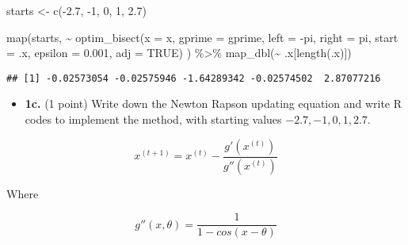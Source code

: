 \documentclass[
]{article}
\newenvironment{Shaded}{\begin{snugshade}}{\end{snugshade}}
\newcommand{\AttributeTok}[1]{\textcolor[rgb]{0.77,0.63,0.00}{#1}}
\newcommand{\ConstantTok}[1]{\textcolor[rgb]{0.00,0.00,0.00}{#1}}
\newcommand{\DecValTok}[1]{\textcolor[rgb]{0.00,0.00,0.81}{#1}}
\newcommand{\FloatTok}[1]{\textcolor[rgb]{0.00,0.00,0.81}{#1}}
\newcommand{\FunctionTok}[1]{\textcolor[rgb]{0.00,0.00,0.00}{#1}}
\newcommand{\NormalTok}[1]{#1}
\newcommand{\OtherTok}[1]{\textcolor[rgb]{0.56,0.35,0.01}{#1}}
\newcommand{\SpecialCharTok}[1]{\textcolor[rgb]{0.00,0.00,0.00}{#1}}
\providecommand{\tightlist}{%
  \setlength{\itemsep}{0pt}\setlength{\parskip}{0pt}}
\begin{document}
\begin{Shaded}
\begin{Highlighting}[]
\NormalTok{starts }\OtherTok{\textless{}{-}} \FunctionTok{c}\NormalTok{(}\SpecialCharTok{{-}}\FloatTok{2.7}\NormalTok{, }\SpecialCharTok{{-}}\DecValTok{1}\NormalTok{, }\DecValTok{0}\NormalTok{, }\DecValTok{1}\NormalTok{, }\FloatTok{2.7}\NormalTok{)}

\FunctionTok{map}\NormalTok{(starts, }\SpecialCharTok{\textasciitilde{}} \FunctionTok{optim\_bisect}\NormalTok{(}\AttributeTok{x =}\NormalTok{ x, }\AttributeTok{gprime =}\NormalTok{ gprime, }
             \AttributeTok{left =} \SpecialCharTok{{-}}\NormalTok{pi, }\AttributeTok{right =}\NormalTok{ pi, }\AttributeTok{start =}\NormalTok{ .x, }
             \AttributeTok{epsilon =} \FloatTok{0.001}\NormalTok{, }\AttributeTok{adj =} \ConstantTok{TRUE}\NormalTok{) }
\NormalTok{) }\SpecialCharTok{\%\textgreater{}\%}
  \FunctionTok{map\_dbl}\NormalTok{(}\SpecialCharTok{\textasciitilde{}}\NormalTok{ .x[}\FunctionTok{length}\NormalTok{(.x)])}
\end{Highlighting}
\end{Shaded}

\begin{verbatim}
## [1] -0.02573054 -0.02575946 -1.64289342 -0.02574502  2.87077216
\end{verbatim}

\begin{itemize}
\tightlist
\item
  \textbf{1c.} (1 point) Write down the Newton Rapson updating equation
  and write R codes to implement the method, with starting values
  \(-2.7, -1, 0, 1, 2.7\).
\end{itemize}

\[x^{(t+1)} = x^{(t)} - \frac{g'(x^{(t)})}{g''(x^{(t)})}\]

Where

\[g''(x, \theta) = 
\frac{1}{1 - cos(x - \theta)}\]
\end{document}
